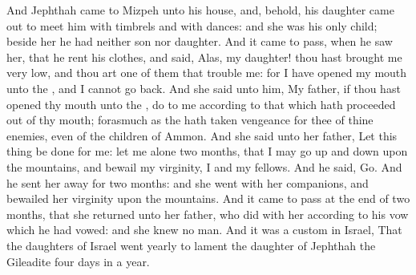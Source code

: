\begin{biblechapter}
\verse And Jephthah came to Mizpeh unto his house, and, behold, his daughter came out to meet him with timbrels and with dances: and she was his only child; beside her he had neither son nor daughter.
\verse And it came to pass, when he saw her, that he rent his clothes, and said, Alas, my daughter! thou hast brought me very low, and thou art one of them that trouble me: for I have opened my mouth unto the \LORD, and I cannot go back.
\verse And she said unto him, My father, if thou hast opened thy mouth unto the \LORD, do to me according to that which hath proceeded out of thy mouth; forasmuch as the \LORD hath taken vengeance for thee of thine enemies, even of the children of Ammon.
\verse And she said unto her father, Let this thing be done for me: let me alone two months, that I may go up and down upon the mountains, and bewail my virginity, I and my fellows.
\verse And he said, Go. And he sent her away for two months: and she went with her companions, and bewailed her virginity upon the mountains.
\verse And it came to pass at the end of two months, that she returned unto her father, who did with her according to his vow which he had vowed: and she knew no man. And it was a custom in Israel,
\verse That the daughters of Israel went yearly to lament the daughter of Jephthah the Gileadite four days in a year.
\end{biblechapter}

